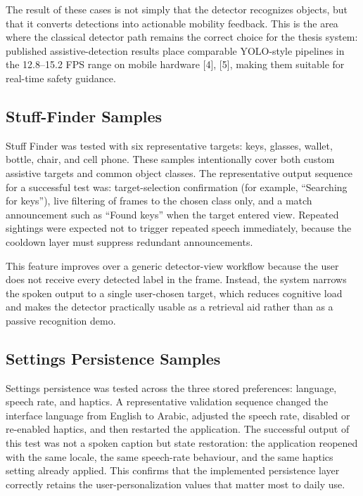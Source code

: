\documentclass[a4paper]{report}
\begin{document}
The result of these cases is not simply that the detector recognizes objects, but that it converts detections into actionable mobility feedback. This is the area where the classical detector path remains the correct choice for the thesis system: published assistive-detection results place comparable YOLO-style pipelines in the 12.8--15.2 FPS range on mobile hardware [4], [5], making them suitable for real-time safety guidance.

\subsection{Stuff-Finder Samples}
Stuff Finder was tested with six representative targets: keys, glasses, wallet, bottle, chair, and cell phone. These samples intentionally cover both custom assistive targets and common object classes. The representative output sequence for a successful test was: target-selection confirmation (for example, ``Searching for keys''), live filtering of frames to the chosen class only, and a match announcement such as ``Found keys'' when the target entered view. Repeated sightings were expected not to trigger repeated speech immediately, because the cooldown layer must suppress redundant announcements.

This feature improves over a generic detector-view workflow because the user does not receive every detected label in the frame. Instead, the system narrows the spoken output to a single user-chosen target, which reduces cognitive load and makes the detector practically usable as a retrieval aid rather than as a passive recognition demo.

\subsection{Settings Persistence Samples}
Settings persistence was tested across the three stored preferences: language, speech rate, and haptics. A representative validation sequence changed the interface language from English to Arabic, adjusted the speech rate, disabled or re-enabled haptics, and then restarted the application. The successful output of this test was not a spoken caption but state restoration: the application reopened with the same locale, the same speech-rate behaviour, and the same haptics setting already applied. This confirms that the implemented persistence layer correctly retains the user-personalization values that matter most to daily use.
\end{document}
